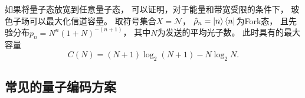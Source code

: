 如果将量子态放宽到任意量子态，
可以证明，对于能量和带宽受限的条件下，
玻色子场可以最大化信道容量\cite{yuen1993ultimate}。
取符号集合$X = \mathcal{N}$，
$\hat{\rho}_n = \ket{n}\bra{n}$为Fork态，
且先验分布$p_n= N^n(1+N)^{-(n+1)}$，
其中$N$为发送的平均光子数。
此时具有的最大容量
\begin{equation}
C(N) = (N+1)\log_2(N+1) -N \log_2 N.
\label{eq:Boson-capacity}
\end{equation}
  





\subsection{常见的量子编码方案}





